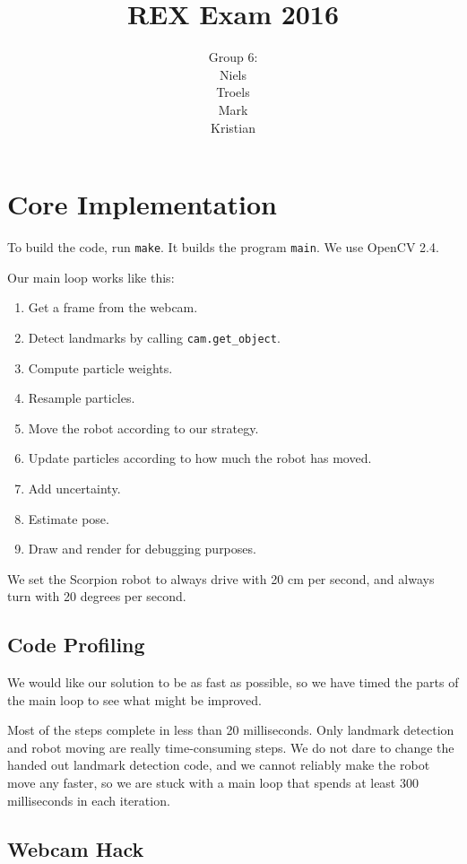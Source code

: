\documentclass[a4paper,12pt]{article}
\title{REX Exam 2016}
\author{Group 6:\\Niels\\Troels\\Mark\\Kristian}
\begin{document}
\maketitle
\newpage

\section{Core Implementation}

To build the code, run \texttt{make}.  It builds the program \texttt{main}.  We
use OpenCV 2.4.

Our main loop works like this:

\begin{enumerate}
\item Get a frame from the webcam.
\item Detect landmarks by calling \texttt{cam.get_object}.
\item Compute particle weights.
\item Resample particles.
\item Move the robot according to our strategy.
\item Update particles according to how much the robot has moved.
\item Add uncertainty.
\item Estimate pose.
\item Draw and render for debugging purposes.
\end{enumerate}

We set the Scorpion robot to always drive with 20 cm per second, and always turn
with 20 degrees per second.


\subsection{Code Profiling}

We would like our solution to be as fast as possible, so we have timed the parts
of the main loop to see what might be improved.

Most of the steps complete in less than 20 milliseconds.  Only landmark
detection and robot moving are really time-consuming steps.  We do not dare to
change the handed out landmark detection code, and we cannot reliably make the
robot move any faster, so we are stuck with a main loop that spends at least 300
milliseconds in each iteration.


\subsection{Webcam Hack}
\end{document}
